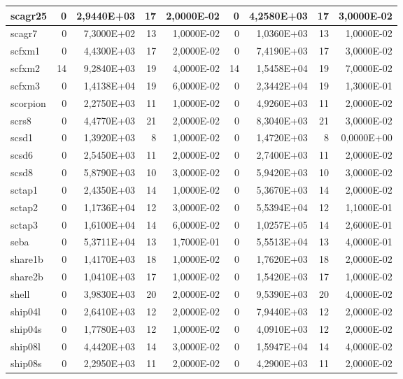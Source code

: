 \begin{tabular}{|l|r|r|r|r|r|r|r|r|}
scagr25 & 0 & 2,9440E+03 & 17 & 2,0000E-02 & 0 & 4,2580E+03 & 17 & 3,0000E-02 \\ \hline
scagr7 & 0 & 7,3000E+02 & 13 & 1,0000E-02 & 0 & 1,0360E+03 & 13 & 1,0000E-02 \\ \hline
scfxm1 & 0 & 4,4300E+03 & 17 & 2,0000E-02 & 0 & 7,4190E+03 & 17 & 3,0000E-02 \\ \hline
scfxm2 & 14 & 9,2840E+03 & 19 & 4,0000E-02 & 14 & 1,5458E+04 & 19 & 7,0000E-02 \\ \hline
scfxm3 & 0 & 1,4138E+04 & 19 & 6,0000E-02 & 0 & 2,3442E+04 & 19 & 1,3000E-01 \\ \hline
scorpion & 0 & 2,2750E+03 & 11 & 1,0000E-02 & 0 & 4,9260E+03 & 11 & 2,0000E-02 \\ \hline
scrs8 & 0 & 4,4770E+03 & 21 & 2,0000E-02 & 0 & 8,3040E+03 & 21 & 3,0000E-02 \\ \hline
scsd1 & 0 & 1,3920E+03 & 8 & 1,0000E-02 & 0 & 1,4720E+03 & 8 & 0,0000E+00 \\ \hline
scsd6 & 0 & 2,5450E+03 & 11 & 2,0000E-02 & 0 & 2,7400E+03 & 11 & 2,0000E-02 \\ \hline
scsd8 & 0 & 5,8790E+03 & 10 & 3,0000E-02 & 0 & 5,9420E+03 & 10 & 3,0000E-02 \\ \hline
sctap1 & 0 & 2,4350E+03 & 14 & 1,0000E-02 & 0 & 5,3670E+03 & 14 & 2,0000E-02 \\ \hline
sctap2 & 0 & 1,1736E+04 & 12 & 3,0000E-02 & 0 & 5,5394E+04 & 12 & 1,1000E-01 \\ \hline
sctap3 & 0 & 1,6100E+04 & 14 & 6,0000E-02 & 0 & 1,0257E+05 & 14 & 2,6000E-01 \\ \hline
seba & 0 & 5,3711E+04 & 13 & 1,7000E-01 & 0 & 5,5513E+04 & 13 & 4,0000E-01 \\ \hline
share1b & 0 & 1,4170E+03 & 18 & 1,0000E-02 & 0 & 1,7620E+03 & 18 & 2,0000E-02 \\ \hline
share2b & 0 & 1,0410E+03 & 17 & 1,0000E-02 & 0 & 1,5420E+03 & 17 & 1,0000E-02 \\ \hline
shell & 0 & 3,9830E+03 & 20 & 2,0000E-02 & 0 & 9,5390E+03 & 20 & 4,0000E-02 \\ \hline
ship04l & 0 & 2,6410E+03 & 12 & 2,0000E-02 & 0 & 7,9440E+03 & 12 & 2,0000E-02 \\ \hline
ship04s & 0 & 1,7780E+03 & 12 & 1,0000E-02 & 0 & 4,0910E+03 & 12 & 2,0000E-02 \\ \hline
ship08l & 0 & 4,4420E+03 & 14 & 3,0000E-02 & 0 & 1,5947E+04 & 14 & 4,0000E-02 \\ \hline
ship08s & 0 & 2,2950E+03 & 11 & 2,0000E-02 & 0 & 4,2900E+03 & 11 & 2,0000E-02 \\ \hline

\end{tabular}
